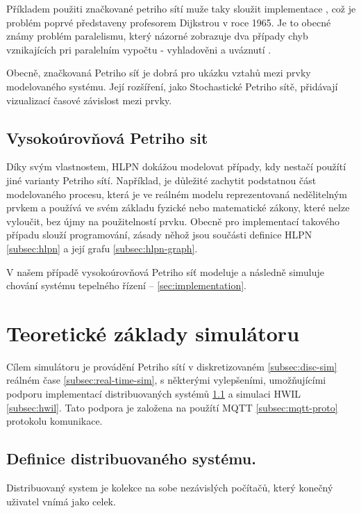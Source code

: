 Příkladem použiti značkované petriho sítí muže taky sloužit implementace  \cite[p.65--67]{PNandMoS}, což je problém poprvé představeny profesorem Dijkstrou v roce 1965.
Je to obecné známy problém paralelismu, který názorné zobrazuje dva případy chyb vznikajících pri paralelním vypočtu - vyhladověni a uváznutí \cite{dining_philosophers}.

Obecně, značkovaná Petriho síť je dobrá pro ukázku vztahů mezi prvky modelovaného systému. Její rozšíření, jako Stochastické Petriho sítě, přidávají vizualizací časové závislost mezi prvky.

\subsection{Vysokoúrovňová Petriho sit}

Díky svým vlastnostem, HLPN dokážou modelovat případy, kdy nestačí použítí jiné varianty Petriho sítí. Například, je důležité zachytit podstatnou část modelovaného procesu, která je ve reálném modelu reprezentovaná nedělitelným prvkem a používá ve svém základu fyzické nebo matematické zákony, které nelze vyloučit, bez újmy na použitelností prvku. Obecně pro implementací takového případu slouží programování, zásady něhož jsou součásti definice HLPN \ref{subsec:hlpn} a její grafu \ref{subsec:hlpn-graph}.

V našem případě vysokoúrovňová Petriho síť modeluje a následně simuluje chování systému tepelného řízení -- \ref{sec:implementation}.

\section{Teoretické základy simulátoru}
\label{sec:sim-theory}

Cílem simulátoru je provádění Petriho sítí v diskretizovaném \ref{subsec:disc-sim} reálném čase \ref{subsec:real-time-sim}, s některými vylepšeními, umožňujícími podporu implementací distribuovaných systémů \ref{subsec:distr_system} a simulaci HWIL \ref{subsec:hwil}. Tato podpora je založena na použítí MQTT \ref{subsec:mqtt-proto} protokolu komunikace.

\subsection{Definice distribuovaného systému.}
\label{subsec:distr_system}

Distribuovaný system je kolekce na sobe nezávislých počítačů, který konečný uživatel vnímá jako celek.

